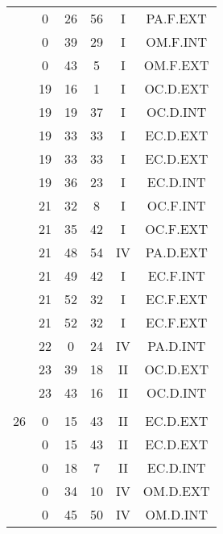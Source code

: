 \documentclass[12pt, a4paper]{article}
\begin{document}
\begin{multicols}{3}
{\begin{tabular}{c c c c c c}
	 	 	 	 & 0 & 26 & 56 & I & PA.F.EXT\\%
	 	 	 	 & 0 & 39 & 29 & I & OM.F.INT\\%
	 	 	 	 & 0 & 43 & 5 & I & OM.F.EXT\\%
	 	 	 	 & 19 & 16 & 1 & I & OC.D.EXT\\%
	 	 	 	 & 19 & 19 & 37 & I & OC.D.INT\\%
	 	 	 	 & 19 & 33 & 33 & I & EC.D.EXT\\%
	 	 	 	 & 19 & 33 & 33 & I & EC.D.EXT\\%
	 	 	 	 & 19 & 36 & 23 & I & EC.D.INT\\%
	 	 	 	 & 21 & 32 & 8 & I & OC.F.INT\\%
	 	 	 	 & 21 & 35 & 42 & I & OC.F.EXT\\%
	 	 	 	 & 21 & 48 & 54 & IV & PA.D.EXT\\%
	 	 	 	 & 21 & 49 & 42 & I & EC.F.INT\\%
	 	 	 	 & 21 & 52 & 32 & I & EC.F.EXT\\%
	 	 	 	 & 21 & 52 & 32 & I & EC.F.EXT\\%
	 	 	 	 & 22 & 0 & 24 & IV & PA.D.INT\\%
	 	 	 	 & 23 & 39 & 18 & II & OC.D.EXT\\%
	 	 	 	 & 23 & 43 & 16 & II & OC.D.INT\\%
	 	 	 	 & & & & & \\%
	 	 	 	26 & 0 & 15 & 43 & II & EC.D.EXT\\%
	 	 	 	 & 0 & 15 & 43 & II & EC.D.EXT\\%
	 	 	 	 & 0 & 18 & 7 & II & EC.D.INT\\%
	 	 	 	 & 0 & 34 & 10 & IV & OM.D.EXT\\%
	 	 	 	 & 0 & 45 & 50 & IV & OM.D.INT\\%

\end{tabular}}
\end{multicols}
\end{document}
